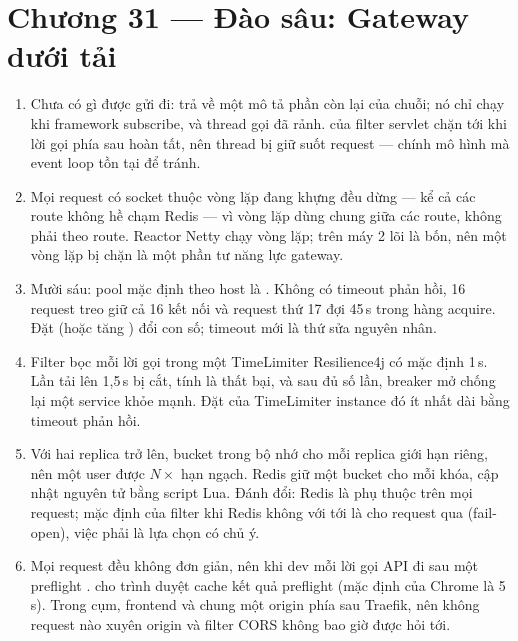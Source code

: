 \section*{Chương 31 --- Đào sâu: Gateway dưới tải}
\begin{enumerate}
  \item Chưa có gì được gửi đi:  trả về một
   mô tả phần còn lại của chuỗi; nó chỉ chạy khi framework
  subscribe, và thread gọi đã rảnh.  của filter servlet
  chặn tới khi lời gọi phía sau hoàn tất, nên thread bị giữ suốt
  request --- chính mô hình mà event loop tồn tại để tránh.
  \item Mọi request có socket thuộc vòng lặp đang khựng đều dừng ---
  kể cả các route không hề chạm Redis --- vì vòng lặp dùng chung giữa
  các route, không phải theo route. Reactor Netty chạy
   vòng lặp; trên máy 2 lõi là bốn, nên một vòng
  lặp bị chặn là một phần tư năng lực gateway.
  \item Mười sáu: pool mặc định theo host là . Không có timeout phản hồi, 16 request treo giữ cả 16 kết
  nối và request thứ 17 đợi 45\,s trong hàng acquire. Đặt
   (hoặc tăng
  ) đổi con số; timeout mới là thứ sửa
  nguyên nhân.
  \item Filter bọc mỗi lời gọi trong một TimeLimiter Resilience4j có
  mặc định 1\,s. Lần tải lên 1,5\,s bị cắt, tính là thất bại, và sau đủ
  số lần, breaker mở chống lại một service khỏe mạnh. Đặt
   của TimeLimiter instance đó ít nhất dài
  bằng timeout phản hồi.
  \item Với hai replica trở lên, bucket trong bộ nhớ cho mỗi replica
  giới hạn riêng, nên một user được $N\times$ hạn ngạch. Redis giữ một
  bucket cho mỗi khóa, cập nhật nguyên tử bằng script Lua. Đánh đổi:
  Redis là phụ thuộc trên mọi request; mặc định của filter khi Redis
  không với tới là cho request qua (fail-open), việc phải là lựa chọn
  có chủ ý.
  \item Mọi request đều không đơn giản, nên khi dev mỗi lời gọi API đi
  sau một preflight .  cho trình duyệt
  cache kết quả preflight (mặc định của Chrome là 5\,s). Trong cụm,
  frontend và  chung một origin phía sau Traefik, nên không
  request nào xuyên origin và filter CORS không bao giờ được hỏi tới.
\end{enumerate}

